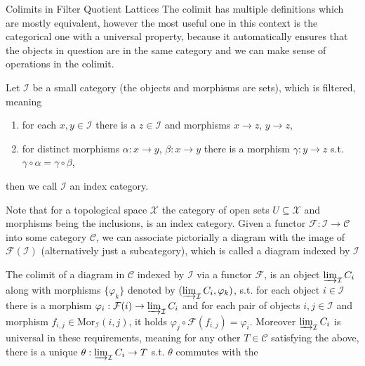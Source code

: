 \begin{subsection}{Colimits in Filter Quotient Lattices}
    The colimit has multiple definitions which are mostly equivalent, however
    the most useful one in this context is the categorical one with a universal property, because
    it automatically ensures that the objects in question are in the same category and we can make sense
    of operations in the colimit.
    \begin{definition} \label{indexcategory}
        Let \( \mathcal{I} \) be a small category (the objects and morphisms are sets), 
        which is filtered, meaning
        \begin{enumerate}
            \item for each \( x, y \in \mathcal{I} \) there is a \( z \in \mathcal{I} \) and morphisms \( x \to z \), \( y \to z \),
            \item for distinct morphisms \( \alpha : x \to y \), \( \beta : x \to y \) there is a morphism \( \gamma : y \to z \) 
                s.t. \( \gamma \circ \alpha = \gamma \circ \beta \),
        \end{enumerate}
        then we call \( \mathcal{I} \) an index category.
    \end{definition}
    Note that for a topological space \( \mathcal{X} \) the category of open sets \( U \subseteq \mathcal{X} \) and 
    morphisms being the inclusions, is an index category.
    Given a functor \( \mathcal{F} : \mathcal{I} \to \mathcal{C} \) into some category \( \mathcal{C} \), we
    can associate pictorially a diagram with the image of \( \mathcal{F}(\mathcal{I}) \) (alternatively just a subcategory),
    which is called a diagram indexed by \( \mathcal{I} \)
    \begin{definition} \label{defcolimit}
        The colimit of a diagram in  \( \mathcal{C} \) indexed by \( \mathcal{I} \) via a functor \( \mathcal{F} \),
        is an object \( \varinjlim_{\mathcal{I}} C_i \) along with morphisms \( \{\varphi_{k}\} \) denoted by 
        \( (\varinjlim_{\mathcal{I}} C_i, \varphi_k) \),
        s.t. for each object \( i \in \mathcal{I} \) there is a morphism \( \varphi_i : \mathcal{F}(i) \to \varinjlim_{\mathcal{I}} C_i \)
        and for each pair of objects \( i, j \in \mathcal{I} \) and morphism \( f_{i,j} \in \text{Mor}_{\mathcal{I}}(i, j) \), 
        it holds \( \varphi_j \circ \mathcal{F}(f_{i,j}) = \varphi_i \).
        Moreover \( \varinjlim_{\mathcal{I}} C_i  \) is universal in these requirements, meaning for any other \( T \in \mathcal{C} \) 
        satisfying the above, there is a unique \( \theta : \varinjlim_{\mathcal{I}} C_i \to T \) s.t. \( \theta \) commutes with the

\end{definition}
\end{subsection}
